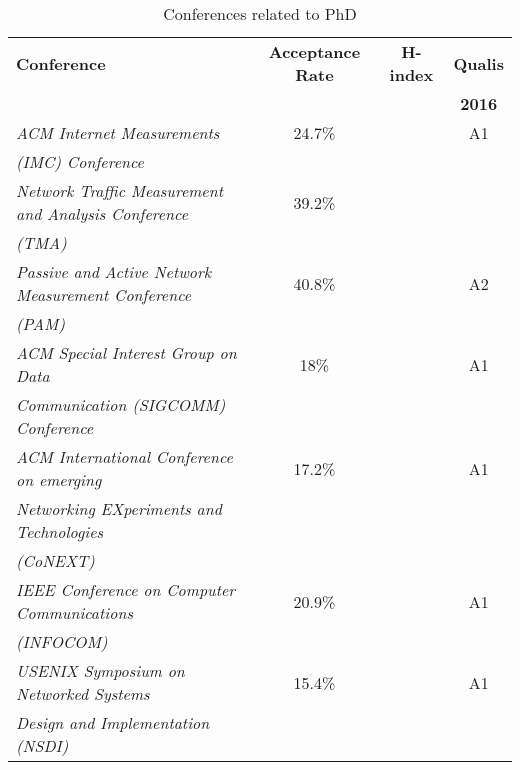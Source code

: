 	\begin{table}[htp]
	\centering
	\begin{tabularx}{\textwidth}{ l | c | c | c}
	\hline
	{\bf Conference} & {\bf Acceptance Rate} & \textbf{H-index} & \textbf{Qualis} \\ 
	                          							  &  &  & \textbf{2016} \\ \hline
	\textit{ACM Internet Measurements}                      &  24.7\% &  & A1  \\
	\textit{(IMC) Conference}                               &         &     &     \\ \hline
	\textit{Network Traffic Measurement and Analysis Conference} & 39.2\%  &   &   \\
	\textit{(TMA)}                                          &         &     &     \\ \hline
	\textit{Passive and Active Network Measurement Conference}& 40.8\% &   & A2  \\
	\textit{(PAM)}                                          &         &     &     \\ \hline
	\textit{ACM Special Interest Group on Data}             &  18\% &  & A1  \\
	\textit{Communication (SIGCOMM) Conference}             &         &     &     \\ \hline
	\textit{ACM International Conference on emerging}       &  17.2\% &   & A1  \\
	\textit{Networking EXperiments and Technologies}        &         &     &     \\
	\textit{(CoNEXT)}                                       &         &     &     \\ \hline
	\textit{IEEE Conference on Computer Communications}     &  20.9\% &  & A1  \\
	\textit{(INFOCOM)}                                      &         &     &     \\ \hline
	\textit{USENIX Symposium on Networked Systems}          &  15.4\% &   & A1  \\
	\textit{Design and Implementation (NSDI)}               &         &     &     \\ \hline

	\hline
	\end{tabularx}
	\caption{Conferences related to PhD}
	\label{tbl:conferences}
	\end{table}